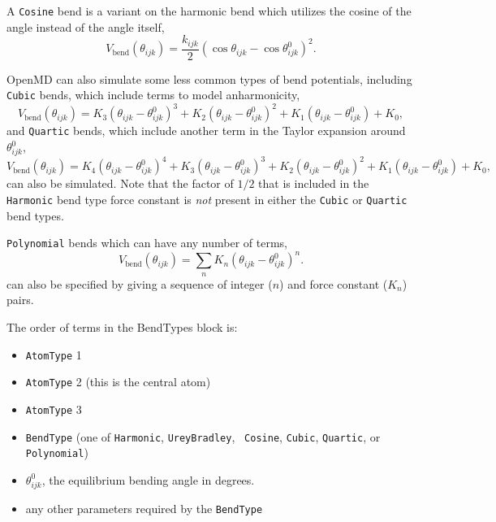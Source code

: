 \documentclass[]{book}
\begin{document}
A {\tt Cosine} bend is a variant on the harmonic bend which utilizes
the cosine of the angle instead of the angle itself,
\begin{equation}
V_{\text{bend}}(\theta_{ijk}) = \frac{k_{ijk}}{2}( \cos\theta_{ijk} -
\cos \theta_{ijk}^0 )^2. \label{eq:cosBend}
\end{equation}

OpenMD can also simulate some less common types of bend potentials,
including {\tt Cubic} bends, which include terms to model anharmonicity,
\begin{equation}
V_{\text{bend}}(\theta_{ijk}) =  K_3 (\theta_{ijk} -  \theta_{ijk}^0)^3 + K_2 (\theta_{ijk} -  \theta_{ijk}^0)^2 + K_1 (\theta_{ijk} -  \theta_{ijk}^0) + K_0,
\end{equation}
and {\tt Quartic} bends, which include another term in the Taylor
expansion around $\theta_{ijk}^0$,
\begin{equation}
  V_{\text{bend}}(\theta_{ijk}) = K_4 (\theta_{ijk} -  \theta_{ijk}^0)^4 +  K_3 (\theta_{ijk} -  \theta_{ijk}^0)^3 +
  K_2 (\theta_{ijk} -  \theta_{ijk}^0)^2 + K_1 (\theta_{ijk} -
  \theta_{ijk}^0) + K_0,
\end{equation}
can also be simulated.  Note that the factor of $1/2$ that is included
in the {\tt Harmonic} bend type force constant is {\it not} present in
either the {\tt Cubic} or {\tt Quartic} bend types.

{\tt Polynomial} bends which can have any number of terms,
\begin{equation}
V_{\text{bend}}(\theta_{ijk}) = \sum_n K_n (\theta_{ijk} -  \theta_{ijk}^0)^n.
\end{equation}
can also be specified by giving a sequence of integer ($n$) and force
constant ($K_n$) pairs.

The order of terms in the BendTypes block is:
\begin{itemize}
\item {\tt AtomType} 1
\item {\tt AtomType} 2 (this is the central atom)
\item {\tt AtomType} 3
\item {\tt BendType} (one of {\tt Harmonic}, {\tt UreyBradley}, {\tt
    Cosine}, {\tt Cubic}, {\tt Quartic}, or {\tt Polynomial})
\item $\theta_{ijk}^0$, the equilibrium bending angle in degrees.
\item any other parameters required by the {\tt BendType}
\end{itemize}
\end{document}
